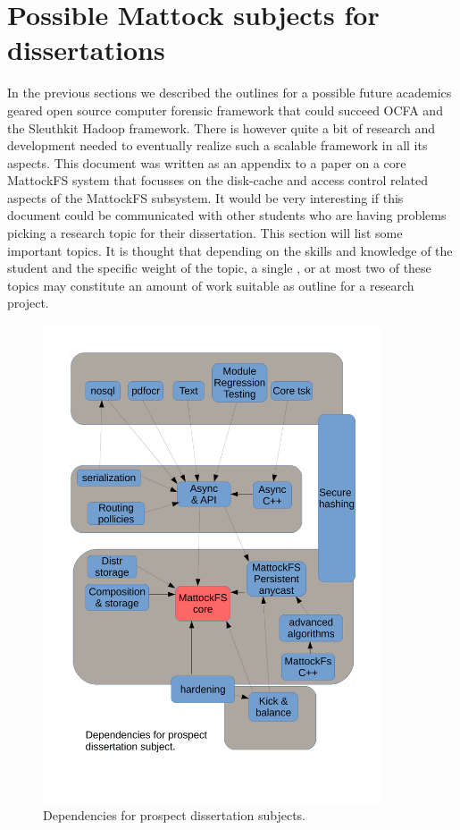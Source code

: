 \section{Possible Mattock subjects for dissertations}
In the previous sections we described the outlines for a possible future academics geared open source computer forensic framework that could succeed OCFA and the Sleuthkit Hadoop framework. There is however quite a bit of research and development needed to eventually realize such a scalable framework in all its aspects. This document was written as an appendix to a paper on a core MattockFS system that focusses on the disk-cache and access control related aspects of the MattockFS subsystem. It would be very interesting if this document could be communicated with other students who are having problems picking a research topic for their dissertation. This section will list some important topics. It is thought that depending on the skills and knowledge of the student and the specific weight of the topic, a single , or at most two of these topics may constitute an amount of work suitable as outline for a research project.
\begin{figure}
\centering
\includegraphics[width=100mm]{mattock/future.pdf}
\caption{Dependencies for prospect dissertation subjects.}
\label{fig:FlowInOut}
\end{figure}
